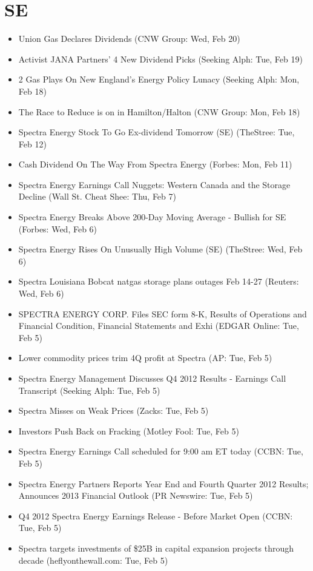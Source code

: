 \documentclass[11pt,asymmetric]{article}
\begin{document}
\section*{SE}
\begin{itemize}
\item Union Gas Declares Dividends (CNW Group: Wed, Feb 20)
\item Activist JANA Partners' 4 New Dividend Picks (Seeking Alph: Tue, Feb 19)
\item 2 Gas Plays On New England's Energy Policy Lunacy (Seeking Alph: Mon, Feb 18)
\item The Race to Reduce is on in Hamilton/Halton (CNW Group: Mon, Feb 18)
\item Spectra Energy Stock To Go Ex-dividend Tomorrow (SE) (TheStree: Tue, Feb 12)
\item Cash Dividend On The Way From Spectra Energy (Forbes: Mon, Feb 11)
\item Spectra Energy Earnings Call Nuggets: Western Canada and the Storage Decline (Wall St. Cheat Shee: Thu, Feb 7)
\item Spectra Energy Breaks Above 200-Day Moving Average - Bullish for SE (Forbes: Wed, Feb 6)
\item Spectra Energy Rises On Unusually High Volume (SE) (TheStree: Wed, Feb 6)
\item Spectra Louisiana Bobcat natgas storage plans outages Feb 14-27 (Reuters: Wed, Feb 6)
\item SPECTRA ENERGY CORP. Files SEC form 8-K, Results of Operations and Financial Condition, Financial Statements and Exhi (EDGAR Online: Tue, Feb 5)
\item Lower commodity prices trim 4Q profit at Spectra (AP: Tue, Feb 5)
\item Spectra Energy Management Discusses Q4 2012 Results - Earnings Call Transcript (Seeking Alph: Tue, Feb 5)
\item Spectra Misses on Weak Prices (Zacks: Tue, Feb 5)
\item Investors Push Back on Fracking (Motley Fool: Tue, Feb 5)
\item Spectra Energy Earnings Call scheduled for 9:00 am ET today (CCBN: Tue, Feb 5)
\item Spectra Energy Partners Reports Year End and Fourth Quarter 2012 Results; Announces 2013 Financial Outlook (PR Newswire: Tue, Feb 5)
\item Q4 2012 Spectra Energy Earnings Release - Before Market Open (CCBN: Tue, Feb 5)
\item Spectra targets investments of \$25B in capital expansion projects through decade (heflyonthewall.com: Tue, Feb 5)

\end{itemize}
\end{document}
